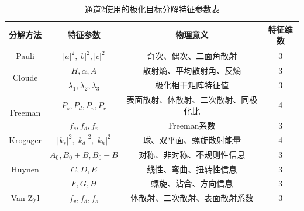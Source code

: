 \begin{table}[ht!]
    \caption{通道2使用的极化目标分解特征参数表}
    \label{tab:decomposition_features}
    \centering
    \begin{tabular}{|c|c|c|c|}
        \hline
        分解方法                     & 特征参数                                                             & 物理意义               & 特征维数 \\ \hline
        Pauli                    & $\left| a \right|^2,\left| b \right|^2,\left| c \right|^2$       & 奇次、偶次、二面角散射        & 3    \\ \hline
        \multirow{2}{*}{Cloude}  & $H,\alpha,A$                                                     & 散射熵、平均散射角、反熵       & 3    \\ \cline{2-4}
                                 & $\lambda_1,\lambda_2,\lambda_3$                                  & 极化相干矩阵特征值          & 3    \\ \hline
        \multirow{2}{*}{Freeman} & $P_s,P_d,P_v,P_r$                                                & 表面散射、体散射、二次散射、同极化比 & 4    \\ \cline{2-4}
                                 & $f_s,f_d,f_v$                                                    & Freeman系数          & 3    \\ \hline
        Krogager                 & $\left| k_s \right|^2,\left| k_d \right|^2,\left| k_h \right|^2$ & 球、双平面、螺旋散射能量       & 4    \\ \hline
        \multirow{3}{*}{Huynen}  & $A_0,B_0+B,B_0-B$                                                & 对称、非对称、不规则性信息      & 3    \\ \cline{2-4}
                                 & $C,D,E$                                                          & 线性、弯曲、扭转性信息        & 3    \\ \cline{2-4}
                                 & $F,G,H$                                                          & 螺旋、沾合、方向信息         & 3    \\ \hline
        Van Zyl                  & $f_v,f_d,f_s$                                                    & 体散射、二次散射、表面散射系数    & 3    \\ \hline
    \end{tabular}
\end{table}

